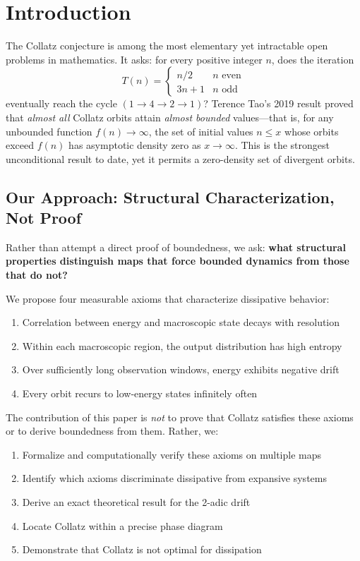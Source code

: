 \documentclass[11pt,a4paper]{article}
\theoremstyle{plain}
\theoremstyle{definition}
\theoremstyle{remark}
\begin{document}
\tableofcontents
\newpage

\section{Introduction}
\label{sec:intro}

The Collatz conjecture is among the most elementary yet intractable open problems in mathematics. It asks: for every positive integer $n$, does the iteration
\begin{equation}
T(n) = \begin{cases} n/2 & n \text{ even} \\ 3n+1 & n \text{ odd} \end{cases}
\end{equation}
eventually reach the cycle $(1 \to 4 \to 2 \to 1)$? Terence Tao's 2019 result \citep{Tao2019} proved that \textit{almost all} Collatz orbits attain \textit{almost bounded} values---that is, for any unbounded function $f(n) \to \infty$, the set of initial values $n \le x$ whose orbits exceed $f(n)$ has asymptotic density zero as $x \to \infty$. This is the strongest unconditional result to date, yet it permits a zero-density set of divergent orbits.

\subsection{Our Approach: Structural Characterization, Not Proof}

Rather than attempt a direct proof of boundedness, we ask: \textbf{what structural properties distinguish maps that force bounded dynamics from those that do not?}

We propose four measurable axioms that characterize dissipative behavior:
\begin{enumerate}
    \item[\textbf{A1}] Correlation between energy and macroscopic state decays with resolution
    \item[\textbf{A2}] Within each macroscopic region, the output distribution has high entropy
    \item[\textbf{A3}] Over sufficiently long observation windows, energy exhibits negative drift
    \item[\textbf{A4}] Every orbit recurs to low-energy states infinitely often
\end{enumerate}

The contribution of this paper is \emph{not} to prove that Collatz satisfies these axioms or to derive boundedness from them. Rather, we:
\begin{enumerate}
    \item Formalize and computationally verify these axioms on multiple maps
    \item Identify which axioms discriminate dissipative from expansive systems
    \item Derive an exact theoretical result for the 2-adic drift
    \item Locate Collatz within a precise phase diagram
    \item Demonstrate that Collatz is not optimal for dissipation
\end{enumerate}
\end{document}
